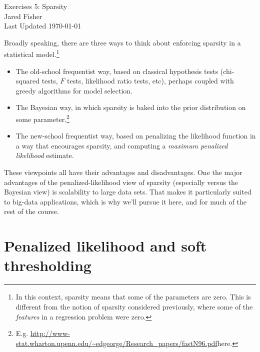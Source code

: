\documentclass{article}
\begin{document}
\large 
\begin{center}
Exercises 5: Sparsity\\
\vspace{10pt}
Jared Fisher\\
Last Updated \today
\end{center}
\normalsize


\bigskip


Broadly speaking, there are three ways to think about enforcing sparsity in a statistical model.\footnote{In this context, sparsity means that some of the parameters are zero.  This is different from the notion of sparsity considered previously, where some of the \textit{features} in a regression problem were zero.}
\begin{itemize}
\item The old-school frequentist way, based on classical hypothesis tests (chi-squared tests, $F$ tests, likelihood ratio tests, etc), perhaps coupled with greedy algorithms for model selection.
\item The Bayesian way, in which sparsity is baked into the prior distribution on some parameter.\footnote{E.g. \url{http://www-stat.wharton.upenn.edu/~edgeorge/Research_papers/fastN96.pdf}{here.}}
\item The new-school frequentist way, based on penalizing the likelihood function in a way that encourages sparsity, and computing a \textit{maximum penalized likelihood} estimate.
\end{itemize}

These viewpoints all have their advantages and disadvantages.  One the major advantages of the penalized-likelihood view of sparsity (especially versus the Bayesian view) is scalability to large data sets.  That makes it particularly suited to big-data applications, which is why we'll pursue it here, and for much of the rest of the course.

\section{Penalized likelihood and soft thresholding}
\end{document}

